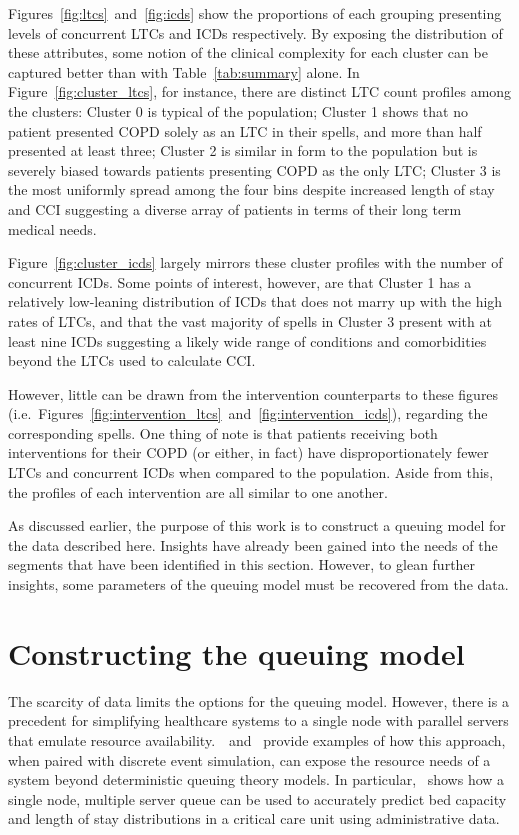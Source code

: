 \documentclass[11pt]{article}
\begin{document}
Figures~\ref{fig:ltcs}~and~\ref{fig:icds} show the proportions of each grouping
presenting levels of concurrent LTCs and ICDs respectively. By exposing the
distribution of these attributes, some notion of the clinical complexity for
each cluster can be captured better than with Table~\ref{tab:summary} alone. In
Figure~\ref{fig:cluster_ltcs}, for instance, there are distinct LTC count
profiles among the clusters: Cluster 0 is typical of the population; Cluster 1
shows that no patient presented COPD solely as an LTC in their spells, and more
than half presented at least three; Cluster 2 is similar in form to the
population but is severely biased towards patients presenting COPD as the only
LTC; Cluster 3 is the most uniformly spread among the four bins despite
increased length of stay and CCI suggesting a diverse array of patients in
terms of their long term medical needs.

Figure~\ref{fig:cluster_icds} largely mirrors these cluster profiles with the
number of concurrent ICDs. Some points of interest, however, are that Cluster 1
has a relatively low-leaning distribution of ICDs that does not marry up with
the high rates of LTCs, and that the vast majority of spells in Cluster 3
present with at least nine ICDs suggesting a likely wide range of conditions and
comorbidities beyond the LTCs used to calculate CCI.\

However, little can be drawn from the intervention counterparts to these figures
(i.e.\ Figures~\ref{fig:intervention_ltcs}~and~\ref{fig:intervention_icds}),
regarding the corresponding spells. One thing of note is that patients receiving
both interventions for their COPD (or either, in fact) have disproportionately
fewer LTCs and concurrent ICDs when compared to the population. Aside from this,
the profiles of each intervention are all similar to one another.

As discussed earlier, the purpose of this work is to construct a queuing model
for the data described here. Insights have already been gained into the needs of
the segments that have been identified in this section. However, to glean
further insights, some parameters of the queuing model must be recovered from
the data.

\section{Constructing the queuing model}\label{sec:model}

The scarcity of data limits the options for the queuing model. However, there is
a precedent for simplifying healthcare systems to a single node with parallel
servers that emulate resource
availability.~\cite{Steins2013}~and~\cite{Williams2015} provide examples of
how this approach, when paired with discrete event simulation, can expose the
resource needs of a system beyond deterministic queuing theory models. In
particular,~\cite{Williams2015} shows how a single node, multiple server queue
can be used to accurately predict bed capacity and length of stay distributions
in a critical care unit using administrative data.
\end{document}
